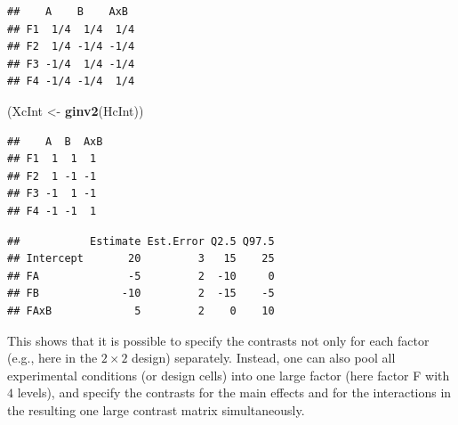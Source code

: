 \documentclass[12pt,]{krantz}
\newenvironment{Shaded}{\begin{snugshade}}{\end{snugshade}}
\newcommand{\DataTypeTok}[1]{\textcolor[rgb]{0.13,0.29,0.53}{#1}}
\newcommand{\DecValTok}[1]{\textcolor[rgb]{0.00,0.00,0.81}{#1}}
\newcommand{\KeywordTok}[1]{\textcolor[rgb]{0.13,0.29,0.53}{\textbf{#1}}}
\newcommand{\NormalTok}[1]{#1}
\newcommand{\OperatorTok}[1]{\textcolor[rgb]{0.81,0.36,0.00}{\textbf{#1}}}
\newcommand{\StringTok}[1]{\textcolor[rgb]{0.31,0.60,0.02}{#1}}
\theoremstyle{definition}
\theoremstyle{definition}
\theoremstyle{definition}
\theoremstyle{remark}
\begin{document}
\begin{verbatim}
##    A    B    AxB 
## F1  1/4  1/4  1/4
## F2  1/4 -1/4 -1/4
## F3 -1/4  1/4 -1/4
## F4 -1/4 -1/4  1/4
\end{verbatim}

\begin{Shaded}
\begin{Highlighting}[]
\NormalTok{(XcInt <-}\StringTok{ }\KeywordTok{ginv2}\NormalTok{(HcInt))}
\end{Highlighting}
\end{Shaded}

\begin{verbatim}
##    A  B  AxB
## F1  1  1  1 
## F2  1 -1 -1 
## F3 -1  1 -1 
## F4 -1 -1  1
\end{verbatim}

\begin{Shaded}
\end{Shaded}

\begin{verbatim}
##           Estimate Est.Error Q2.5 Q97.5
## Intercept       20         3   15    25
## FA              -5         2  -10     0
## FB             -10         2  -15    -5
## FAxB             5         2    0    10
\end{verbatim}

This shows that it is possible to specify the contrasts not only for each factor (e.g., here in the \(2 \times 2\) design) separately. Instead, one can also pool all experimental conditions (or design cells) into one large factor (here factor F with \(4\) levels), and specify the contrasts for the main effects and for the interactions in the resulting one large contrast matrix simultaneously.
\end{document}
